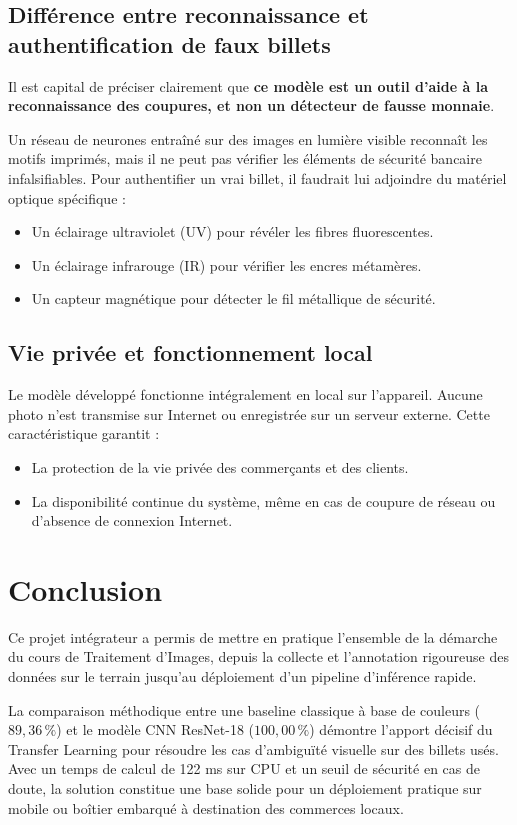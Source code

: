 \documentclass[11pt,a4paper]{article}
\begin{document}
\subsection{Différence entre reconnaissance et authentification de faux billets}
Il est capital de préciser clairement que \textbf{ce modèle est un outil d'aide à la reconnaissance des coupures, et non un détecteur de fausse monnaie}.

Un réseau de neurones entraîné sur des images en lumière visible reconnaît les motifs imprimés, mais il ne peut pas vérifier les éléments de sécurité bancaire infalsifiables. Pour authentifier un vrai billet, il faudrait lui adjoindre du matériel optique spécifique :
\begin{itemize}
    \item Un éclairage ultraviolet (UV) pour révéler les fibres fluorescentes.
    \item Un éclairage infrarouge (IR) pour vérifier les encres métamères.
    \item Un capteur magnétique pour détecter le fil métallique de sécurité.
\end{itemize}

\subsection{Vie privée et fonctionnement local}
Le modèle développé fonctionne intégralement en local sur l'appareil. Aucune photo n'est transmise sur Internet ou enregistrée sur un serveur externe. Cette caractéristique garantit :
\begin{itemize}
    \item La protection de la vie privée des commerçants et des clients.
    \item La disponibilité continue du système, même en cas de coupure de réseau ou d'absence de connexion Internet.
\end{itemize}

\section{Conclusion}
Ce projet intégrateur a permis de mettre en pratique l'ensemble de la démarche du cours de Traitement d'Images, depuis la collecte et l'annotation rigoureuse des données sur le terrain jusqu'au déploiement d'un pipeline d'inférence rapide.

La comparaison méthodique entre une baseline classique à base de couleurs ($89{,}36\,\%$) et le modèle CNN ResNet-18 ($100{,}00\,\%$) démontre l'apport décisif du Transfer Learning pour résoudre les cas d'ambiguïté visuelle sur des billets usés. Avec un temps de calcul de 122 ms sur CPU et un seuil de sécurité en cas de doute, la solution constitue une base solide pour un déploiement pratique sur mobile ou boîtier embarqué à destination des commerces locaux.
\end{document}
